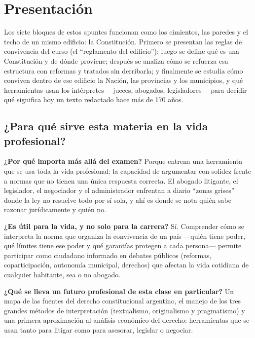 \documentclass[12pt,oneside]{book}
\begin{document}
\tableofcontents

\chapter*{Presentación}

Los siete bloques de estos apuntes funcionan como los cimientos, las paredes y el techo de un mismo edificio: la Constitución. Primero se presentan las reglas de convivencia del curso (el ``reglamento del edificio''); luego se define qué es una Constitución y de dónde proviene; después se analiza cómo se refuerza esa estructura con reformas y tratados sin derribarla; y finalmente se estudia cómo conviven dentro de ese edificio la Nación, las provincias y los municipios, y qué herramientas usan los intérpretes ---jueces, abogados, legisladores--- para decidir qué significa hoy un texto redactado hace más de 170 años.

\section*{¿Para qué sirve esta materia en la vida profesional?}

\textbf{¿Por qué importa más allá del examen?} Porque entrena una herramienta que se usa toda la vida profesional: la capacidad de argumentar con solidez frente a normas que no tienen una única respuesta correcta. El abogado litigante, el legislador, el negociador y el administrador enfrentan a diario ``zonas grises'' donde la ley no resuelve todo por sí sola, y ahí es donde se nota quién sabe razonar jurídicamente y quién no.

\textbf{¿Es útil para la vida, y no solo para la carrera?} Sí. Comprender cómo se interpreta la norma que organiza la convivencia de un país ---quién tiene poder, qué límites tiene ese poder y qué garantías protegen a cada persona--- permite participar como ciudadano informado en debates públicos (reformas, coparticipación, autonomía municipal, derechos) que afectan la vida cotidiana de cualquier habitante, sea o no abogado.

\textbf{¿Qué se lleva un futuro profesional de esta clase en particular?} Un mapa de las fuentes del derecho constitucional argentino, el manejo de los tres grandes métodos de interpretación (textualismo, originalismo y pragmatismo) y una primera aproximación al análisis económico del derecho: herramientas que se usan tanto para litigar como para asesorar, legislar o negociar.
\end{document}
